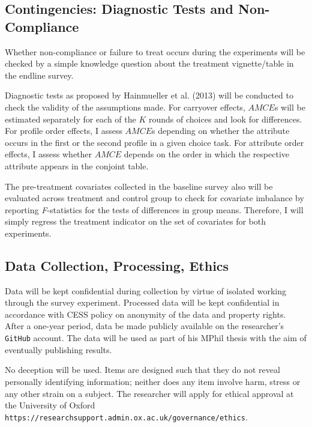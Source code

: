 \documentclass[11pt]{article}
\begin{document}
\subsection{Contingencies: Diagnostic Tests and Non-Compliance}
Whether non-compliance or failure to treat occurs during the experiments will be checked by a simple knowledge question about the treatment vignette/table in the endline survey.

Diagnostic tests as proposed by Hainmueller et al. (2013) will be conducted to check the validity of the assumptions made. For carryover effects, $AMCE$s will be estimated separately for each of the $K$ rounds of choices and look for differences. For profile order effects, I assess $AMCE$s depending on whether the attribute occurs in the first or the second profile in a given choice task. For attribute order effects, I assess whether $AMCE$ depends on the order in which the respective attribute appears in the conjoint table. 

The pre-treatment covariates collected in the baseline survey also will be evaluated across treatment and control group to check for covariate imbalance by reporting \textit{F}-statistics for the tests of differences in group means. Therefore, I will simply regress the treatment indicator on the set of covariates for both experiments.

\subsection{Data Collection, Processing, Ethics}
Data will be kept confidential during collection by virtue of isolated working through the survey experiment. Processed data will be kept confidential in accordance with CESS policy on anonymity of the data and property rights. After a one-year period, data be made publicly available on the researcher's \texttt{GitHub} account. The data will be used as part of his MPhil thesis with the aim of eventually publishing results.

No deception will be used. Items are designed such that they do not reveal personally identifying information; neither does any item involve harm, stress or any other strain on a subject. The researcher will apply for ethical approval at the University of Oxford\\ \texttt{https://researchsupport.admin.ox.ac.uk/governance/ethics}.

\newpage
\end{document}
